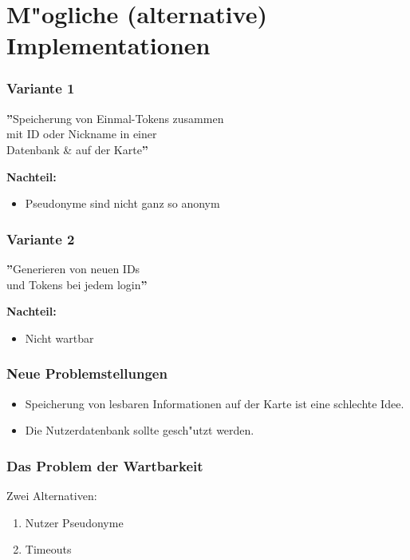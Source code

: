 \section{M"ogliche (alternative) Implementationen}
\begin{frame}
	\frametitle{Variante 1}
	\textbf{''}Speicherung von Einmal-Tokens zusammen\\
	mit ID oder Nickname in einer\\
	Datenbank \& auf der Karte\textbf{''}

	\vspace{1cm}\par

	\textbf<2->{Nachteil:}
	\begin{itemize}
		\item<2-> Pseudonyme sind nicht ganz so anonym
	\end{itemize}
\end{frame}

\begin{frame}
	\frametitle{Variante 2}
	\textbf{''}Generieren von neuen IDs\\
	und Tokens bei jedem login\textbf{''}

	\vspace{1cm}

	\textbf<2->{Nachteil:}
	\begin{itemize}
		\item<2-> Nicht wartbar
	\end{itemize}
\end{frame}

\begin{frame}
	\frametitle {Neue Problemstellungen}
	\begin{itemize}
		\item<2-> Speicherung von lesbaren Informationen auf der
		Karte ist eine schlechte Idee.
		\item<3-> Die Nutzerdatenbank sollte gesch"utzt werden.
	\end{itemize}
\end{frame}

\begin{frame}
	\frametitle{Das Problem der Wartbarkeit}
	Zwei Alternativen:
	\begin{enumerate}
		\item<2-> Nutzer Pseudonyme
		\item<3-> Timeouts
	\end{enumerate}
\end{frame}
